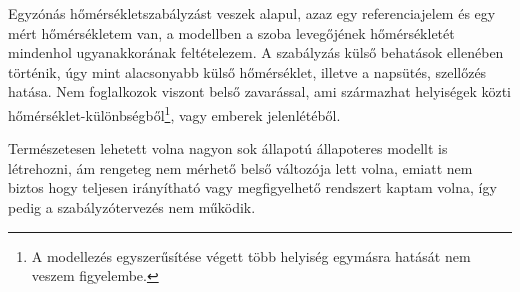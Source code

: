 
%





%
%
%
%


Egyzónás hőmérsékletszabályzást veszek alapul, azaz egy referenciajelem és egy mért hőmérsékletem van, a modellben a szoba levegőjének hőmérsékletét mindenhol ugyanakkorának feltételezem. A szabályzás külső behatások ellenében történik, úgy mint alacsonyabb külső hőmérséklet, illetve a napsütés, szellőzés hatása. Nem foglalkozok viszont belső zavarással, ami származhat helyiségek közti hőmérséklet-különbségből\footnote{A modellezés egyszerűsítése végett több helyiség egymásra hatását nem veszem figyelembe.}, vagy emberek jelenlétéből.

Természetesen lehetett volna nagyon sok állapotú állapoteres modellt is létrehozni, ám rengeteg nem mérhető belső változója lett volna, emiatt nem biztos hogy teljesen irányítható vagy megfigyelhető rendszert kaptam volna, így pedig a szabályzótervezés nem működik.

\begin{table}[H]
	\footnotesize
	\centering
	\caption{Jelölések}
	
	\label{tab:Nomenclature}
\end{table}
 
